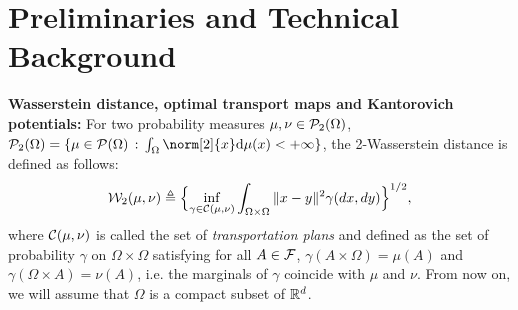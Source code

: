 
\section{Preliminaries and Technical Background}
\label{sec:techbg}





\vspace{-5pt}

\textbf{Wasserstein distance, optimal transport maps and Kantorovich potentials: }
%
For two probability measures $\mu,\nu \in {\cal P}_2(\Omega)$, $\PS_2(\Omega) = \{ \mu \in \PS(\Omega) \, :\, \int_{\Omega} \norm[2]{x} \rmd \mu(x) < \plusinfty\}$, the 2-Wasserstein distance is defined as follows:
\begin{align}
{\cal W}_2(\mu,\nu) \triangleq \Bigl\{ \inf_{\gamma \in {\cal C}(\mu,\nu)} \int_{\Omega \times \Omega} \|x-y\|^2 \gamma(dx , dy) \Bigr\}^{1/2}, \label{eqn:w2}
\end{align}
where ${\cal C}(\mu,\nu)$ is called the set of \emph{transportation plans} and defined as the set of probability $\gamma$ on $\Omega \times \Omega$ satisfying for all $A \in \mathcal{F}$, $\gamma(A \times \Omega) = \mu(A)$ and $\gamma(\Omega \times A)=\nu(A)$, i.e. the  marginals of $\gamma$  coincide with $\mu$ and $\nu$. From now on, we will assume that $\Omega$ is a compact subset of $\mathbb{R}^d$.


